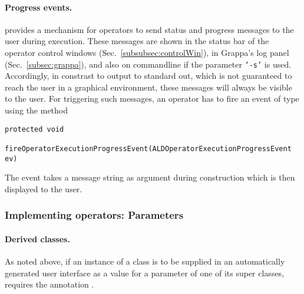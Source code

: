 \paragraph{Progress events.} \alida provides a mechanism for operators
to send status and progress messages to the user during execution. These messages
are shown in the status bar of the operator control windows
(Sec.~\ref{subsubsec:controlWin}), in Grappa's log panel
(Sec.~\ref{subsec:grappa}), and also on commandline if the parameter \texttt{'-s'} is used.
Accordingly, in constrast to output to standard out,
which is not guaranteed to reach the user in a graphical environment, these messages will always be visible
to the user. For triggering such messages, an operator has to fire an event of
type  using the method\\
\begin{lstlisting}[xrightmargin=.00\textwidth, xleftmargin=.0\textwidth,frame=single,numbers=none]
  protected void
	  fireOperatorExecutionProgressEvent(ALDOperatorExecutionProgressEvent ev)
\end{lstlisting}
The event takes a message string as argument during construction which is then
displayed to the user.

\subsubsection{Implementing operators: Parameters}
\label{subsubsec:datatypes}

\paragraph{Derived classes.}
As noted above, 
if an instance of a class is to be supplied in an automatically
generated user interface as a value for a parameter of one of its super classes,
\alida requires the annotation .


